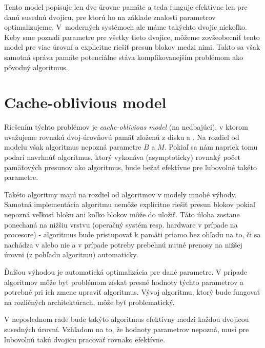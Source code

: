 
Tento model popisuje len dve úrovne pamäte a teda funguje efektívne len pre danú susednú dvojicu, pre ktorú ho na základe znalosti parametrov optimalizujeme. V~moderných systémoch ale máme takýchto dvojíc niekoľko. Keby sme poznali parametre pre všetky tieto dvojice, môžeme zovšeobecniť tento model pre viac úrovní a explicitne riešiť presun blokov medzi nimi. Takto sa však samotná správa pamäte potenciálne stáva komplikovanejším problémom ako pôvodný algoritmus.


\section{Cache-oblivious model}
Riešením týchto problémov je \emph{cache-oblivious model} (na \cache nedbajúci), v ktorom uvažujeme rovnakú dvoj-úrovňovú pamäť zloženú z disku a \cache \citep{frigo1999cache,prokop1999cache}. Na rozdiel od \aware modelu však algoritmus nepozná parametre $B$ a $M$. Pokiaľ sa nám napriek tomu podarí navrhnúť algoritmus, ktorý vykonáva (asymptoticky) rovnaký počet pamäťových presunov ako \aware algoritmus, bude bežať efektívne pre ľubovolné takéto parametre.

Takéto algoritmy majú na rozdiel od \aware algoritmov v \extmem modely mnohé výhody. Samotná implementácia algoritmu nemôže explicitne riešiť presun blokov pokiaľ nepozná veľkosť bloku ani koľko blokov môže do \cache uložiť. Táto úloha zostane ponechaná na nižšiu vrstvu (operačný systém resp. hardware v prípade \cache na procesore) - algoritmus bude pristupovať k pamäti priamo bez ohľadu na to, či sa nachádza v \cache alebo nie a v prípade potreby prebehnú nutné prenosy na nižšej úrovni (z pohľadu algoritmu) automaticky.

Ďalšou výhodou je automatická optimalizácia pre dané parametre. V prípade \aware algoritmov môže byť problémom získať presné hodnoty týchto parametrov a potrebné pri ich zmene upraviť algoritmus. Vývoj algoritmu, ktorý bude fungovať na rozličných architektúrach, môže byť problematický.

V neposlednom rade bude takýto \obliv algoritmus efektívny medzi každou dvojicou susedných úrovní. Vzhľadom na to, že hodnoty parametrov nepozná, musí pre ľubovolnú takú dvojicu pracovať rovnako efektívne.


